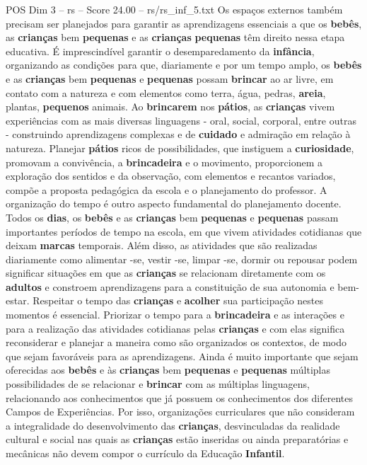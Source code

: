 \begin{textsample}{POS Dim 3 – rs – Score 24.00 – rs/rs\_inf\_5.txt}
Os espaços externos também precisam ser planejados para garantir as aprendizagens essenciais a que os \textbf{bebês}, as \textbf{crianças} bem \textbf{pequenas} e as \textbf{crianças} \textbf{pequenas} têm direito nessa etapa educativa.
É imprescindível garantir o desemparedamento da \textbf{infância}, organizando as condições para que, diariamente e por um tempo amplo, os \textbf{bebês} e as \textbf{crianças} bem \textbf{pequenas} e \textbf{pequenas} possam \textbf{brincar} ao ar livre, em contato com a natureza e com elementos como terra, água, pedras, \textbf{areia}, plantas, \textbf{pequenos} animais.
Ao \textbf{brincarem} nos \textbf{pátios}, as \textbf{crianças} vivem experiências com as mais diversas linguagens - oral, social, corporal, entre outras - construindo aprendizagens complexas e de \textbf{cuidado} e admiração em relação à natureza.
Planejar \textbf{pátios} ricos de possibilidades, que instiguem a \textbf{curiosidade}, promovam a convivência, a \textbf{brincadeira} e o movimento, proporcionem a exploração dos sentidos e da observação, com elementos e recantos variados, compõe a proposta pedagógica da escola e o planejamento do professor.
A organização do tempo é outro aspecto fundamental do planejamento docente.
Todos os \textbf{dias}, os \textbf{bebês} e as \textbf{crianças} bem \textbf{pequenas} e \textbf{pequenas} passam importantes períodos de tempo na escola, em que vivem atividades cotidianas que deixam \textbf{marcas} temporais.
Além disso, as atividades que são realizadas diariamente como alimentar -se, vestir -se, limpar -se, dormir ou repousar podem significar situações em que as \textbf{crianças} se relacionam diretamente com os \textbf{adultos} e constroem aprendizagens para a constituição de sua autonomia e bem-estar.
Respeitar o tempo das \textbf{crianças} e \textbf{acolher} sua participação nestes momentos é essencial.
Priorizar o tempo para a \textbf{brincadeira} e as interações e para a realização das atividades cotidianas pelas \textbf{crianças} e com elas significa reconsiderar e planejar a maneira como são organizados os contextos, de modo que sejam favoráveis para as aprendizagens.
Ainda é muito importante que sejam oferecidas aos \textbf{bebês} e às \textbf{crianças} bem \textbf{pequenas} e \textbf{pequenas} múltiplas possibilidades de se relacionar e \textbf{brincar} com as múltiplas linguagens, relacionando aos conhecimentos que já possuem os conhecimentos dos diferentes Campos de Experiências.
Por isso, organizações curriculares que não consideram a integralidade do desenvolvimento das \textbf{crianças}, desvinculadas da realidade cultural e social nas quais as \textbf{crianças} estão inseridas ou ainda preparatórias e mecânicas não devem compor o currículo da Educação \textbf{Infantil}.

\end{textsample}

